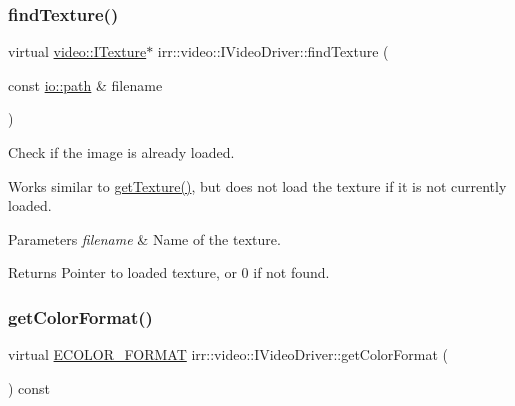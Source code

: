 \subsubsection{\texorpdfstring{find\+Texture()}{findTexture()}\hspace{0.1cm}{\footnotesize\ttfamily [2/2]}}
{\footnotesize\ttfamily virtual \hyperlink{classirr_1_1video_1_1ITexture}{video\+::\+I\+Texture}$\ast$ irr\+::video\+::\+I\+Video\+Driver\+::find\+Texture (\begin{DoxyParamCaption}\item[{const \hyperlink{namespaceirr_1_1io_a6468281622ce3a1c46b72e19f32dded5}{io\+::path} \&}]{filename }\end{DoxyParamCaption})\hspace{0.3cm}{\ttfamily [pure virtual]}}



Check if the image is already loaded. 

Works similar to \hyperlink{classirr_1_1video_1_1IVideoDriver_af4055165190e4adf221c6dc6f2434ea0}{get\+Texture()}, but does not load the texture if it is not currently loaded. 
\begin{DoxyParams}{Parameters}
{\em filename} & Name of the texture. \\
\hline
\end{DoxyParams}
\begin{DoxyReturn}{Returns}
Pointer to loaded texture, or 0 if not found. 
\end{DoxyReturn}
\mbox{\label{classirr_1_1video_1_1IVideoDriver_afc8f27bfd9756f4ca8de2d4bb37b0e15}} 
\subsubsection{\texorpdfstring{get\+Color\+Format()}{getColorFormat()}\hspace{0.1cm}{\footnotesize\ttfamily [1/2]}}
{\footnotesize\ttfamily virtual \hyperlink{namespaceirr_1_1video_a1d5e487888c32b1674a8f75116d829ed}{E\+C\+O\+L\+O\+R\+\_\+\+F\+O\+R\+M\+AT} irr\+::video\+::\+I\+Video\+Driver\+::get\+Color\+Format (\begin{DoxyParamCaption}{ }\end{DoxyParamCaption}) const\hspace{0.3cm}{\ttfamily [pure virtual]}}



